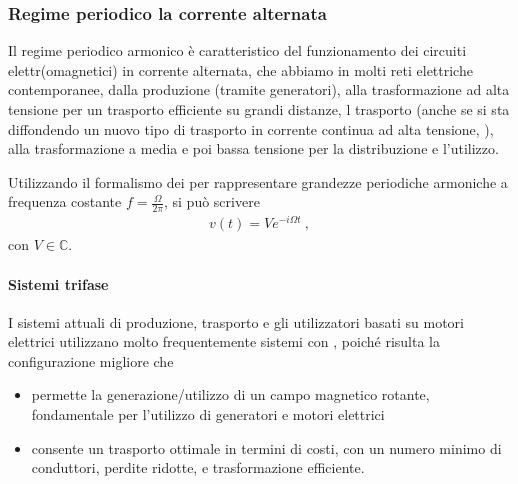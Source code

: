 \documentclass[letterpaper,10pt,italian]{jupyterBook}
\begin{document}
\subsubsection{Regime periodico \sphinxhyphen{} la corrente alternata}
\label{\detokenize{ch/electromagnetism/circuits-electric:regime-periodico-la-corrente-alternata}}\label{\detokenize{ch/electromagnetism/circuits-electric:physics-hs-electromagnetism-circuits-electric-regimes-ac}}
\sphinxAtStartPar
Il regime periodico armonico è caratteristico del funzionamento dei circuiti elettr(omagnetici) in corrente alternata, che abbiamo in molti reti elettriche contemporanee, dalla produzione (tramite generatori), alla trasformazione ad alta tensione per un trasporto efficiente su grandi distanze, l trasporto (anche se si sta diffondendo un nuovo tipo di trasporto in corrente continua ad alta tensione, ), alla trasformazione a media e poi bassa tensione per la distribuzione e l’utilizzo.

\sphinxAtStartPar
Utilizzando il formalismo dei  per rappresentare grandezze periodiche armoniche a frequenza costante \(f = \frac{\Omega}{2 \pi}\), si può scrivere
\begin{equation*}
\begin{split}v(t) = V e^{-i \Omega t} \ ,\end{split}
\end{equation*}
\sphinxAtStartPar
con \(V \in \mathbb{C}\). 

\sphinxAtStartPar
{}

\sphinxAtStartPar
{}


\paragraph{Sistemi trifase}
\label{\detokenize{ch/electromagnetism/circuits-electric:sistemi-trifase}}\label{\detokenize{ch/electromagnetism/circuits-electric:physics-hs-electromagnetism-circuits-electric-regimes-ac-tri}}
\sphinxAtStartPar
I sistemi attuali di produzione, trasporto e gli utilizzatori basati su motori elettrici utilizzano molto frequentemente sistemi con , poiché risulta la configurazione migliore che
\begin{itemize}
\item {} 
\sphinxAtStartPar
permette la generazione/utilizzo di un campo magnetico rotante, fondamentale per l’utilizzo di generatori e motori elettrici

\item {} 
\sphinxAtStartPar
consente un trasporto ottimale in termini di costi, con un numero minimo di conduttori, perdite ridotte, e trasformazione efficiente.

\end{itemize}
\end{document}

